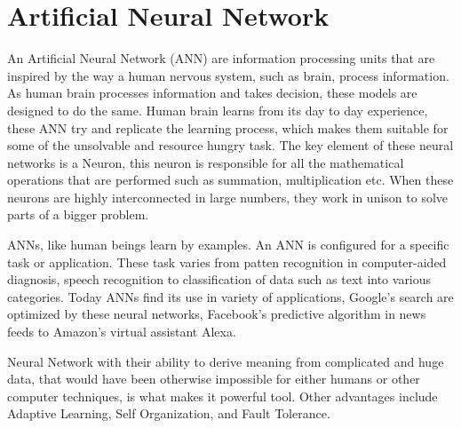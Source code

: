 \documentclass[12pt, a4paper]{report}
\begin{document}
\section{Artificial Neural Network}\label{ANN}
An Artificial Neural Network (ANN) are information processing units that are inspired by the way a human nervous system, such as brain, process information. As human brain processes information and takes decision, these models are designed to do the same. Human brain learns from its day to day experience, these ANN try and replicate the learning process, which makes them suitable for some of the unsolvable and resource hungry task. The key element of these neural networks is a Neuron, this neuron is responsible for all the mathematical operations that are performed such as summation, multiplication etc. When these neurons are highly interconnected in large numbers, they work in unison to solve parts of a bigger problem.\\ \par

ANNs, like human beings learn by examples. An ANN is configured for a specific task or application. These task varies from patten recognition in computer-aided diagnosis, speech recognition to classification of data such as text into various categories. Today ANNs find its use in variety of applications, Google's search are optimized by these neural networks, Facebook's predictive algorithm in news feeds to Amazon's virtual assistant Alexa. \\ \par

Neural Network with their ability to derive meaning from complicated and huge data, that would have been otherwise impossible for either humans or other computer techniques, is what makes it powerful tool. Other advantages include Adaptive Learning, Self Organization, and Fault Tolerance.\\ \par
\end{document}
